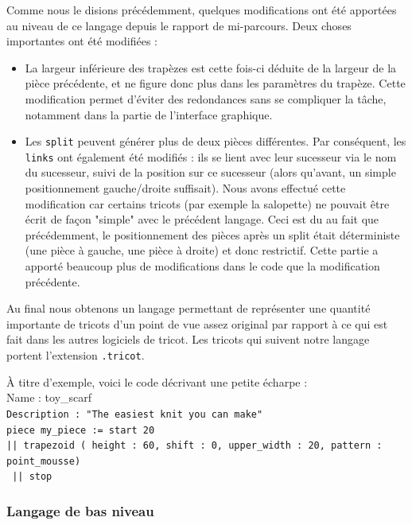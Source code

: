 \documentclass{article}
\begin{document}
Comme nous le disions précédemment, quelques modifications ont été
apportées au niveau de ce langage depuis le rapport de
mi-parcours. Deux choses importantes ont été modifiées :
\begin{itemize}
	\item La largeur inférieure des trapèzes est cette fois-ci
          déduite de la largeur de la pièce précédente, et ne figure
          donc plus dans les paramètres du trapèze. Cette modification
          permet d'éviter des redondances sans se compliquer la tâche,
          notamment dans la partie de l'interface graphique.
	\item Les \texttt{split} peuvent générer plus de deux pièces
          différentes. Par conséquent, les \texttt{links} ont
          également été modifiés : ils se lient avec leur sucesseur
          via le nom du sucesseur, suivi de la position sur ce
          sucesseur (alors qu'avant, un simple positionnement
          gauche/droite suffisait). Nous avons effectué cette
          modification car certains tricots (par exemple la salopette)
          ne pouvait être écrit de façon "simple" avec le précédent
          langage. Ceci est du au fait que précédemment, le
          positionnement des pièces après un split était déterministe
          (une pièce à gauche, une pièce à droite) et donc
          restrictif. Cette partie a apporté beaucoup plus de
          modifications dans le code que la modification précédente.
\end{itemize}

Au final nous obtenons un langage permettant de représenter une quantité importante 
de tricots d'un point de vue assez original par rapport à ce qui est fait dans les 
autres logiciels de tricot. Les tricots qui suivent notre langage portent l'extension 
\texttt{.tricot}.

À titre d'exemple, voici le code décrivant une petite écharpe :\\
\textrm{Name : toy\_scarf}\\
\texttt{Description : "The easiest knit you can make"}\\
\texttt{piece my\_piece := start 20 }\\
\texttt{|| trapezoid ( height : 60, shift : 0, upper\_width : 20, pattern : point\_mousse)}\\
\texttt{ || stop}


\subsubsection{Langage de bas niveau}
\end{document}
